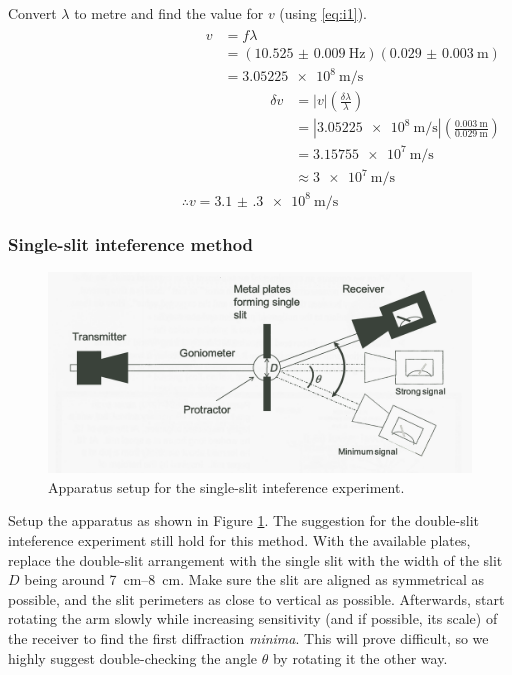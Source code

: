 \documentclass[letter,12pt]{article}
\newcommand{\tlambda}{\(\lambda\) }
\newcommand{\ttheta}{\(\theta\) }
\numberwithin{equation}{section}
\numberwithin{figure}{section}
\numberwithin{table}{section}
\begin{document}
Convert \tlambda to metre and find the value for \(v\) (using \eqref{eq:i1}).
\begin{align*}
  \begin{split}
  v &= f \lambda \\
  &= (\SI{10.525(9)}{\hertz})(\SI{0.029(3)}{\m}) \\
  &= \SI{3.05225e8}{\metre\per\second}
  \end{split}
  \begin{split}
    \delta v &= |v|\left( \frac{\delta \lambda}{\lambda} \right) \\
    &= |\SI{3.05225e8}{\metre\per\second}|\left( \frac{\SI{0.003}{\m}}{\SI{0.029}{\m}} \right) \\
    &= \SI{3.15755e7}{\m\per\s} \\
    &\approx \SI{3e7}{\m\per\s}
  \end{split}
\end{align*}
\[\therefore v = \SI{3.1(3)e8}{\m\per\s}\]

\subsubsection{Single-slit inteference method}
\begin{figure}[!ht]
  \centering
  \includegraphics[width=\textwidth]{Single-slit.png}
  \caption{Apparatus setup for the single-slit inteference experiment.}
  \label{fig:e2}
\end{figure}

Setup the apparatus as shown in Figure \ref{fig:e2}. The suggestion for the double-slit inteference experiment still hold for this method. With the available plates, replace the double-slit arrangement with the single slit with the width of the slit \(D\) being around \SIrange{7}{8}{\cm}. Make sure the slit are aligned as symmetrical as possible, and the slit perimeters as close to vertical as possible. Afterwards, start rotating the arm slowly while increasing sensitivity (and if possible, its scale) of the receiver to find the first diffraction \emph{minima}. This will prove difficult, so we highly suggest double-checking the angle \ttheta by rotating it the other way.
\end{document}
